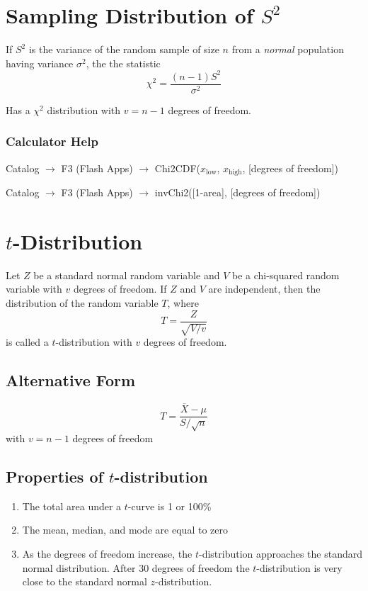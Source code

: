 \documentclass{book}
\begin{document}
\section{Sampling Distribution of $S^2$}

If $S^2$ is the variance of the random sample of size $n$ from a \emph{normal} population having variance $\sigma^2$, the the statistic
$$\chi^2=\frac{(n-1)S^2}{\sigma^2}$$

Has a $\chi^2$ distribution with $v=n-1$ degrees of freedom.

\subsubsection{Calculator Help}

Catalog $\rightarrow$ F3 (Flash Apps) $\rightarrow$ Chi2CDF($x_\text{low}$, $x_\text{high}$, [degrees of freedom])

Catalog $\rightarrow$ F3 (Flash Apps) $\rightarrow$ invChi2([1-area], [degrees of freedom])

\section{$t$-Distribution}

Let $Z$ be a standard normal random variable and $V$ be a chi-squared random variable with $v$ degrees of freedom. If $Z$ and $V$ are independent, then the distribution of the random variable $T$, where
$$
T=\frac{Z}{\sqrt{V/v}}
$$
is called a $t$-distribution with $v$ degrees of freedom.

\subsection{Alternative Form}

$$
T=\frac{\overline{X}-\mu}{S/\sqrt{n}}
$$
 with $v=n-1$ degrees of freedom

\subsection{Properties of $t$-distribution}

\begin{enumerate}
\item The total area under a $t$-curve is 1 or 100\%
\item The mean, median, and mode are equal to zero
\item As the degrees of freedom increase, the $t$-distribution approaches the standard normal distribution. After 30 degrees of freedom the $t$-distribution is very close to the standard normal $z$-distribution.
\end{enumerate}
\end{document}
